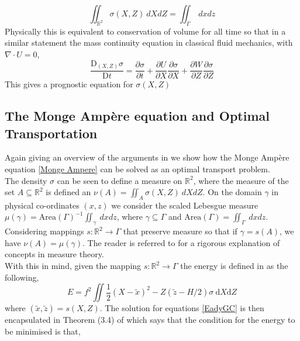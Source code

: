 \begin{equation}
	\iint_{\mathbb{R}^2} \sigma\left(X,Z\right) \ dXdZ = \iint_\Gamma \ dxdz
\label{equivalent measures}
\end{equation}
Physically this is equivalent to conservation of volume for all time so that in a similar statement the mass continuity equation in classical fluid mechanics, with $\nabla \cdot U =0$,
\begin{equation}
	\frac{\textrm{D}_{(X,Z)}\sigma}{\textrm{D}t} = \frac{\partial \sigma}{\partial t} + \frac{\partial U}{\partial X}\frac{\partial \sigma}{\partial X}+ \frac{\partial W}{\partial Z}\frac{\partial \sigma}{\partial Z}
\end{equation}
This gives a prognostic equation for $\sigma(X ,Z)$
\subsection{The Monge Amp\`{e}re equation and Optimal Transportation}
Again giving an overview of the arguments in \cite{Cullen2006a} we show how the Monge Amp\`{e}re equation \ref{Monge Ampere} can be solved as an optimal transport problem.
\\
\linebreak
The density $\sigma$ can be seen to define a measure on $\mathbb{R}^2$, where the measure of the set $A \subseteq \mathbb{R}^2$ is defined an $\nu(A) = \iint_{A} \sigma(X,Z) \ dXdZ$. On the domain $\gamma$ in physical co-ordinates $(x,z)$ we consider the scaled Lebesgue measure $\mu(\gamma) = \textrm{Area}(\Gamma)^{-1}\iint_{\gamma} \ dxdz$, where $\gamma \subseteq \Gamma$ and $\textrm{Area}(\Gamma)=\iint_{\Gamma} \ dxdz$. Considering mappings $s: \mathbb{R}^2 \rightarrow \Gamma$ that preserve measure so that if $\gamma = s(A)$, we have $\nu(A) = \mu(\gamma)$. The reader is referred to \cite{Rudin1987} for a rigorous explanation of concepts in measure theory.
\\
\linebreak
With this in mind, given the mapping $s: \mathbb{R}^2 \rightarrow \Gamma$ the energy is defined in \cite{Cullen2006a} as the following,
\begin{equation}
E = f^2 \iint \frac{1}{2}\left(X-\tilde{x}\right)^2 - Z\left(\tilde{z} - H/2\right)\sigma \ \textrm{d}X\textrm{d}Z
\end{equation}
where $\left(\tilde{x},\tilde{z}\right) = s(X,Z)$. The solution for equations \ref{EadyGC} is then encapsulated in Theorem (3.4) of \cite{Cullen2006a} which says that the condition for the energy to be minimised is that,
